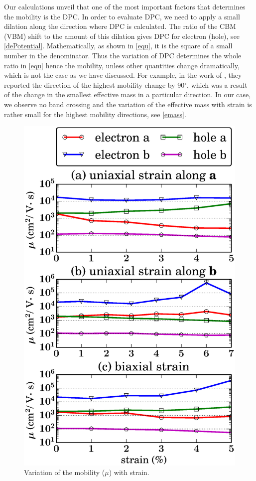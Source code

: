 Our calculations unveil that one of the most important  factors  that determines the mobility is the DPC.  In order to evaluate DPC, we need to apply a small dilation  along the direction where DPC is calculated. The ratio of the CBM (VBM) shift  to the amount of this dilation gives DPC for electron (hole), see \autoref{dePotential}. Mathematically, as shown in \autoref{equ}, it is the square of a small number in the denominator. Thus the variation of DPC determines the whole ratio in \autoref{equ} hence the mobility, unless other quantities change dramatically, which is not the case as we have discussed. For example, in the work of \citet{fei}, they reported the direction of the highest mobility change by 90$^{\circ}$, which was a result of the change in the smallest effective mass in a particular direction. In our case, we  observe no band crossing  and the variation of the  effective mass with strain is rather small for the highest mobility directions, see \autoref{emass}.   

\begin{figure}[htb]
\centering
\includegraphics[width=0.6\linewidth]{Mob_mobility.eps}
\caption{Variation of the mobility ($\mu$) with strain.\label{mobility}}
\end{figure}

